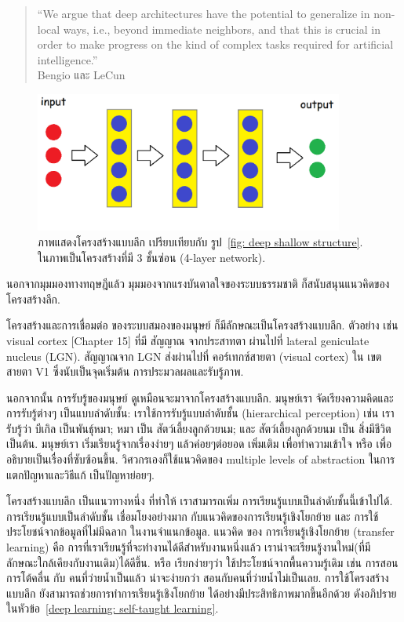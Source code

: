 \begin{verse}
``We argue that deep architectures have the potential to generalize in non-local ways, i.e., beyond immediate neighbors, and that this is crucial in order to make progress on the kind of complex tasks required for artificial intelligence.''
\\Bengio และ LeCun\cite{BengioLeCun2007a} 
\end{verse}

%
\begin{figure}
\begin{center}
\includegraphics[width=4in]{04ANNDeep/DeepStructure.png}
\end{center}
\caption{ภาพแสดงโครงสร้างแบบลึก เปรียบเทียบกับ รูป~\ref{fig: deep shallow structure}.
  ในภาพเป็นโครงสร้างที่มี 3 ชั้นซ่อน (4-layer network).}
\label{fig: deep deep structure}
\end{figure}
%

นอกจากมุมมองทางทฤษฎีแล้ว มุมมองจากแรงบันดาลใจของระบบธรรมชาติ ก็สนับสนุนแนวคิดของ โครงสร้างลึก.

โครงสร้างและการเชื่อมต่อ ของระบบสมองของมนุษย์ ก็มีลักษณะเป็นโครงสร้างแบบลึก.
ตัวอย่าง เช่น visual cortex \cite{NeuroscienceOnline}[Chapter 15] ที่มี สัญญาณ จากประสาทตา ผ่านไปที่ lateral geniculate nucleus (LGN).
สัญญาณจาก LGN ส่งผ่านไปที่ คอร์เทกซ์สายตา (visual cortex) ใน เขตสายตา V1 ซึ่งนับเป็นจุดเริ่มต้น การประมวลผลและรับรู้ภาพ.

นอกจากนั้น การรับรู้ของมนุษย์ ดูเหมือนจะมาจากโครงสร้างแบบลึก.
มนุษย์เรา จัดเรียงความคิดและการรับรู้ต่างๆ เป็นแบบลำดับชั้น:
เราใช้การรับรู้แบบลำดับชั้น (hierarchical perception) เช่น เรารับรู้ว่า บีเกิล เป็นพันธ์ุหมา; หมา เป็น สัตว์เลี้ยงลูกด้วยนม; และ สัตว์เลี้ยงลูกด้วยนม เป็น สิ่งมีชีวิต เป็นต้น.
มนุษย์เรา เริ่มเรียนรู้จากเรื่องง่ายๆ แล้วค่อยๆต่อยอด เพิ่มเติม เพื่อทำความเข้าใจ หรือ เพื่อ อธิบายเป็นเรื่องที่ซับซ้อนขึ้น.
วิศวกรเองก็ใช้แนวคิดของ multiple levels of abstraction ในการแตกปัญหาและวิธีแก้ เป็นปัญหาย่อยๆ.

โครงสร้างแบบลึก เป็นแนวทางหนึ่ง ที่ทำให้ เราสามารถเพิ่ม การเรียนรู้แบบเป็นลำดับชั้นนี้เข้าไปได้.
การเรียนรู้แบบเป็นลำดับชั้น เชื่อมโยงอย่างมาก กับแนวคิดของการเรียนรู้เชิงโยกย้าย และ การใช้ประโยชน์จากข้อมูลที่ไม่มีฉลาก ในงานจำแนกข้อมูล.
แนวคิด ของ การเรียนรู้เชิงโยกย้าย (transfer learning) คือ การที่เราเรียนรู้ที่จะทำงานได้ดีสำหรับงานหนึ่งแล้ว เราน่าจะเรียนรู้งานใหม่(ที่มีลักษณะใกล้เคียงกับงานเดิม)ได้ดีขึ้น.
หรือ เรียกง่ายๆว่า ใช้ประโยชน์จากพื้นความรู้เดิม เช่น การสอนการโต้คลื่น กับ คนที่ว่ายน้ำเป็นแล้ว น่าจะง่ายกว่า สอนกับคนที่ว่ายน้ำไม่เป็นเลย.
%
การใช้โครงสร้างแบบลึก ยังสามารถช่วยการทำการเรียนรู้เชิงโยกย้าย ได้อย่างมีประสิทธิภาพมากขึ้นอีกด้วย ดังอภิปรายในหัวข้อ~\ref{deep learning: self-taught learning}.

